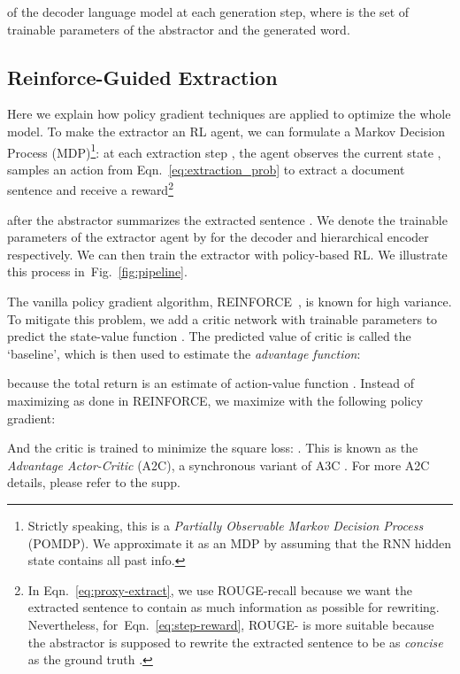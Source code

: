 \documentclass[11pt,a4paper]{article}
\def\figref#1{Fig.~\ref{#1}}
\def\eqnref#1{Eqn.~\ref{#1}}
\begin{document}
of the decoder language model at each generation step,
where  is the set of trainable parameters of the abstractor and  the  generated word.

\subsection{Reinforce-Guided Extraction}
\label{sec:rl-ext}
Here we explain how policy gradient techniques are applied to optimize the whole model.
To make the extractor an RL agent, we can formulate a Markov Decision Process (MDP)\footnote{Strictly speaking, this is a \textit{Partially Observable Markov Decision Process} (POMDP). 
We approximate it as an MDP by assuming that the RNN hidden state contains all past info.}: 
at each extraction step , the agent observes the current state , 
samples an action 
 from \eqnref{eq:extraction_prob}
to extract a document sentence and 
receive a reward\footnote{In \eqnref{eq:proxy-extract}, we use ROUGE-recall because we want the extracted sentence to contain as much information as possible for rewriting.
Nevertheless, for~\eqnref{eq:step-reward}, ROUGE- is more suitable because the abstractor  is supposed to rewrite the extracted sentence  to be as \textit{concise} as the ground truth .
}
\vspace{-5pt}

after the abstractor summarizes the extracted sentence .
We denote the trainable parameters of the extractor agent 
by  for the decoder and hierarchical encoder respectively.
We can then train the extractor with policy-based RL.
We illustrate this process in~\figref{fig:pipeline}.

The vanilla policy gradient algorithm, REINFORCE~\citep{Williams:1992:SSG:139611.139614}, is known for high variance.
To mitigate this problem, we add a critic network with trainable parameters  to predict the state-value function .
The predicted value of critic  is called the `baseline',
which is then used to estimate the \textit{advantage function}:

because the total return  is an estimate of action-value function .
Instead of maximizing  as done in REINFORCE, we maximize  with the following policy gradient:
\vspace{-5pt}

And the critic is trained to minimize the square loss:
.
This is known as the \textit{Advantage Actor-Critic} (A2C), a synchronous variant of A3C \citep{pmlr-v48-mniha16}.
For more A2C details, please refer to the supp.
\end{document}
